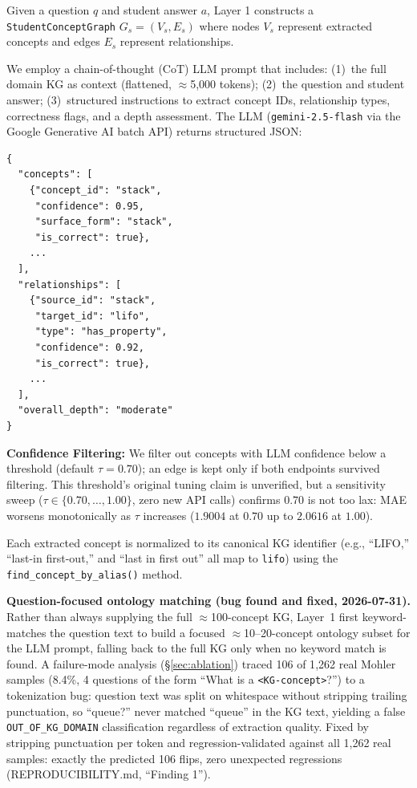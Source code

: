 \documentclass[conference]{IEEEtran}
\begin{document}
Given a question $q$ and student answer $a$, Layer 1 constructs a
\texttt{StudentConceptGraph} $G_s = (V_s, E_s)$ where nodes $V_s$ represent
extracted concepts and edges $E_s$ represent relationships.

We employ a chain-of-thought (CoT) LLM prompt \cite{wei2022cot} that includes: (1)~the full domain
KG as context (flattened, $\approx$5,000 tokens); (2)~the question and student
answer; (3)~structured instructions to extract concept IDs, relationship types,
correctness flags, and a depth assessment. The LLM (\texttt{gemini-2.5-flash}
via the Google Generative AI batch API) returns structured JSON:

\begin{small}
\begin{verbatim}
{
  "concepts": [
    {"concept_id": "stack",
     "confidence": 0.95,
     "surface_form": "stack",
     "is_correct": true},
    ...
  ],
  "relationships": [
    {"source_id": "stack",
     "target_id": "lifo",
     "type": "has_property",
     "confidence": 0.92,
     "is_correct": true},
    ...
  ],
  "overall_depth": "moderate"
}
\end{verbatim}
\end{small}

\textbf{Confidence Filtering:} We filter out concepts with LLM
confidence below a threshold (default $\tau = 0.70$); an edge is kept
only if both endpoints survived filtering. This threshold's original
tuning claim is unverified, but a sensitivity sweep
($\tau \in \{0.70, \ldots, 1.00\}$, zero
new API calls) confirms $0.70$ is not too lax: MAE worsens
monotonically as $\tau$ increases ($1.9004$ at $0.70$ up to $2.0616$
at $1.00$).

Each extracted concept is normalized to its canonical KG identifier (e.g.,
``LIFO,'' ``last-in first-out,'' and ``last in first out'' all map to
\texttt{lifo}) using the \texttt{find\_concept\_by\_alias()} method.

\textbf{Question-focused ontology matching (bug found and fixed,
2026-07-31).} Rather than always supplying the full $\approx$100-concept
KG, Layer~1 first keyword-matches the question text to build a focused
$\approx$10--20-concept ontology subset for the LLM prompt, falling
back to the full KG only when no keyword match is found. A
failure-mode analysis (\S\ref{sec:ablation}) traced 106 of 1{,}262
real Mohler samples (8.4\%, 4 questions of the form ``What is a
\texttt{<KG-concept>}?'') to a tokenization bug: question text was
split on whitespace without stripping trailing punctuation, so
``queue?'' never matched ``queue'' in the KG text, yielding a false
\texttt{OUT\_OF\_KG\_DOMAIN} classification regardless of extraction
quality. Fixed by stripping punctuation per token and
regression-validated against all 1{,}262 real samples: exactly the
predicted 106 flips, zero unexpected regressions (REPRODUCIBILITY.md,
``Finding 1'').
\end{document}
